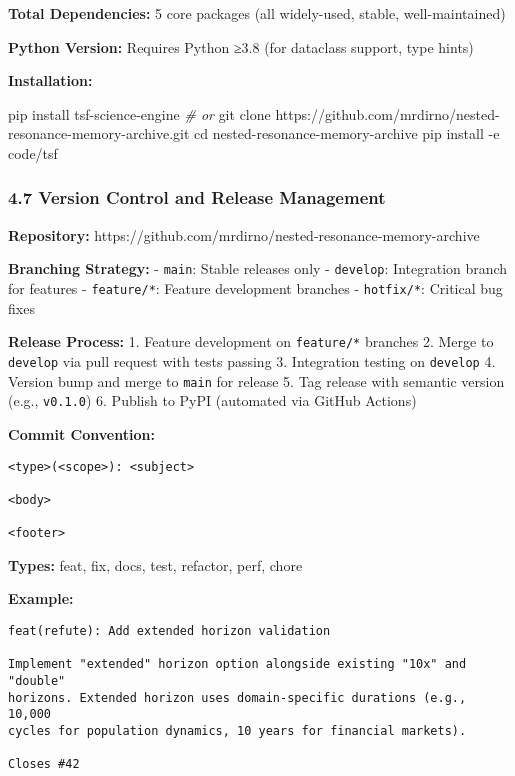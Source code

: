 \documentclass[
]{article}
\newenvironment{Shaded}{}{}
\newcommand{\AttributeTok}[1]{\textcolor[rgb]{0.49,0.56,0.16}{#1}}
\newcommand{\BuiltInTok}[1]{\textcolor[rgb]{0.00,0.50,0.00}{#1}}
\newcommand{\CommentTok}[1]{\textcolor[rgb]{0.38,0.63,0.69}{\textit{#1}}}
\newcommand{\ExtensionTok}[1]{#1}
\newcommand{\FunctionTok}[1]{\textcolor[rgb]{0.02,0.16,0.49}{#1}}
\newcommand{\NormalTok}[1]{#1}
\begin{document}
\textbf{Total Dependencies:} 5 core packages (all widely-used, stable,
well-maintained)

\textbf{Python Version:} Requires Python ≥3.8 (for dataclass support,
type hints)

\textbf{Installation:}

\begin{Shaded}
\begin{Highlighting}[]
\ExtensionTok{pip}\NormalTok{ install tsf{-}science{-}engine}
\CommentTok{\# or}
\FunctionTok{git}\NormalTok{ clone https://github.com/mrdirno/nested{-}resonance{-}memory{-}archive.git}
\BuiltInTok{cd}\NormalTok{ nested{-}resonance{-}memory{-}archive}
\ExtensionTok{pip}\NormalTok{ install }\AttributeTok{{-}e}\NormalTok{ code/tsf}
\end{Highlighting}
\end{Shaded}

\subsubsection{4.7 Version Control and Release
Management}\label{version-control-and-release-management}

\textbf{Repository:}
https://github.com/mrdirno/nested-resonance-memory-archive

\textbf{Branching Strategy:} - \texttt{main}: Stable releases only -
\texttt{develop}: Integration branch for features - \texttt{feature/*}:
Feature development branches - \texttt{hotfix/*}: Critical bug fixes

\textbf{Release Process:} 1. Feature development on \texttt{feature/*}
branches 2. Merge to \texttt{develop} via pull request with tests
passing 3. Integration testing on \texttt{develop} 4. Version bump and
merge to \texttt{main} for release 5. Tag release with semantic version
(e.g., \texttt{v0.1.0}) 6. Publish to PyPI (automated via GitHub
Actions)

\textbf{Commit Convention:}

\begin{verbatim}
<type>(<scope>): <subject>

<body>

<footer>
\end{verbatim}

\textbf{Types:} feat, fix, docs, test, refactor, perf, chore

\textbf{Example:}

\begin{verbatim}
feat(refute): Add extended horizon validation

Implement "extended" horizon option alongside existing "10x" and "double"
horizons. Extended horizon uses domain-specific durations (e.g., 10,000
cycles for population dynamics, 10 years for financial markets).

Closes #42
\end{verbatim}
\end{document}
